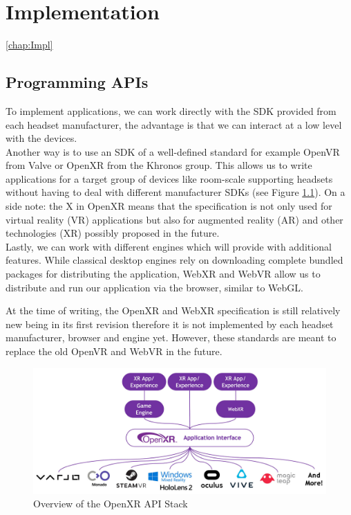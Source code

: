 \chapter{Implementation}
\ref{chap:Impl}
\section{Programming APIs}

To implement applications, we can work directly with the SDK provided from each headset manufacturer, the advantage is that we can interact at a low level with the devices.\\ 
Another way is to use an SDK of a well-defined standard for example OpenVR from Valve or OpenXR from the Khronos group. This allows us to write applications for a target group of devices like room-scale supporting headsets without having to deal with different manufacturer SDKs (see Figure \ref{fig:openxr-overview}). On a side note: the X in OpenXR means that the specification is not only used for virtual reality (VR) applications but also for augmented reality (AR) and other technologies (XR) possibly proposed in the future.\\
Lastly, we can work with different engines which will provide with additional features. While classical desktop engines rely on downloading complete bundled packages for distributing the application, WebXR and WebVR allow us to distribute and run our application via the browser, similar to WebGL.

At the time of writing, the OpenXR and WebXR specification is still relatively new being in its first revision therefore it is not implemented by each headset manufacturer, browser and engine yet. However, these standards are meant to replace the old OpenVR and WebVR in the future.

\begin{figure}[h]
    \centering
    \includegraphics[width=\textwidth]{graphics/openXR-overview.jpg}
    \caption{Overview of the OpenXR API Stack \cite{khronosGroupOpenXR}}
    \label{fig:openxr-overview}
\end{figure}


